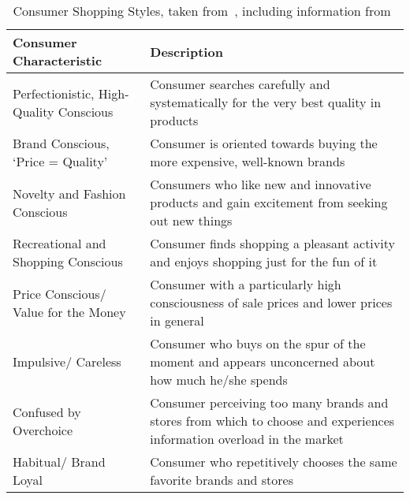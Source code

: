 \begin{table}[ht]
	\begin{tabular}{p{} p{}}
		\toprule
		Consumer Characteristic                 & Description                                                                                                            \\\midrule
		Perfectionistic, High-Quality Conscious & Consumer searches carefully and \newline systematically for the very best quality in products                          \\
		Brand Conscious, `Price = Quality'      & Consumer is oriented towards buying the more expensive, well-known brands                                              \\
		Novelty and Fashion Conscious           & Consumers who like new and innovative products and gain excitement from seeking out new things                         \\
		Recreational and Shopping Conscious     & Consumer finds shopping a pleasant activity and enjoys shopping just for the fun of it                                 \\
		Price Conscious/ Value for the Money    & Consumer with a particularly high consciousness of sale prices and lower prices in general                             \\
		Impulsive/ Careless                     & Consumer who buys on the spur of the moment and appears unconcerned about how much he/she spends                       \\
		Confused by Overchoice                  & Consumer perceiving too many brands and stores from which to choose and experiences information overload in the market \\
		Habitual/ Brand Loyal                   & Consumer who repetitively chooses the same favorite brands and stores                                                  \\\bottomrule
	\end{tabular}
	\caption{Consumer Shopping Styles, taken from~\cite{ShoppingStyles}, including information from~\cite{ShoppingStyles2}}\label{tab:shoppingStyles}
\end{table}

\newpage

